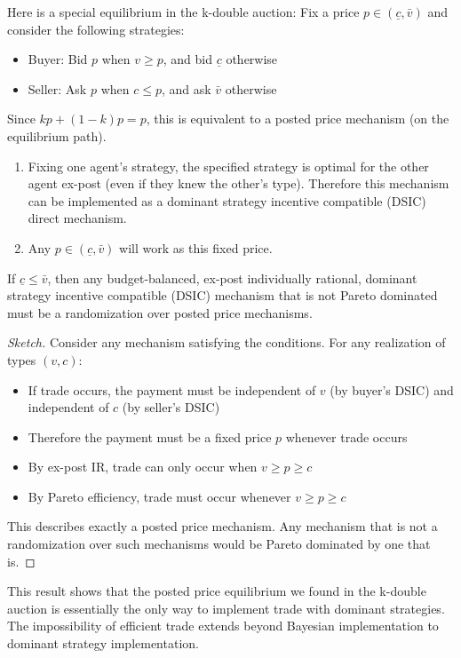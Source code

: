 \documentclass[11pt]{elegantbook_2}
\begin{document}
\begin{example}
    Here is a special equilibrium in the k-double auction:
    Fix a price $p \in (\underline{c}, \bar{v})$ and consider the following strategies:
    \begin{itemize}
        \item Buyer: Bid $p$ when $v \geq p$, and bid $\underline{c}$ otherwise
        \item Seller: Ask $p$ when $c \leq p$, and ask $\bar{v}$ otherwise
    \end{itemize}
    Since $kp + (1-k)p = p$, this is equivalent to a posted price mechanism (on the equilibrium path).
\end{example}
\begin{note}
    \begin{enumerate}
        \item Fixing one agent's strategy, the specified strategy is optimal for the other agent ex-post (even if they knew the other's type). Therefore this mechanism can be implemented as a dominant strategy incentive compatible (DSIC) direct mechanism.
        \item Any $p \in (\underline{c}, \bar{v})$ will work as this fixed price.
    \end{enumerate}
\end{note}


\begin{theorem}
    If $\underline{c} \leq \bar{v}$, then any budget-balanced, ex-post individually rational, dominant strategy incentive compatible (DSIC) mechanism that is not Pareto dominated must be a randomization over posted price mechanisms.
\end{theorem}

\begin{proof}[Sketch]
    Consider any mechanism satisfying the conditions. For any realization of types $(v,c)$:
    \begin{itemize}
        \item If trade occurs, the payment must be independent of $v$ (by buyer's DSIC) and independent of $c$ (by seller's DSIC)
        \item Therefore the payment must be a fixed price $p$ whenever trade occurs
        \item By ex-post IR, trade can only occur when $v \geq p \geq c$
        \item By Pareto efficiency, trade must occur whenever $v \geq p \geq c$
    \end{itemize}
    This describes exactly a posted price mechanism. Any mechanism that is not a randomization over such mechanisms would be Pareto dominated by one that is.
\end{proof}
This result shows that the posted price equilibrium we found in the k-double auction is essentially the only way to implement trade with dominant strategies. The impossibility of efficient trade extends beyond Bayesian implementation to dominant strategy implementation.
\end{document}
